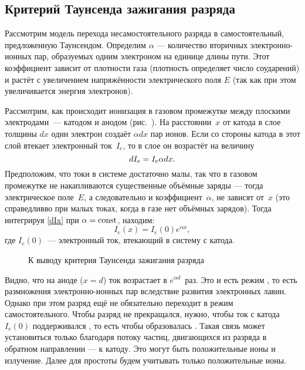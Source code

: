 \subsection*{Критерий Таунсенда зажигания разряда}
Рассмотрим модель перехода несамостоятельного разряда в самостоятельный,
предложенную Таунсендом.
Определим  $\alpha$ ---
количество вторичных электронно-ионных пар, образуемых одним электроном
на единице длины пути.
Этот коэффициент зависит от плотности газа
(плотность определяет число соударений)
и растёт с увеличением напряжённости электрического поля $E$
(так как при этом увеличивается энергия электронов).

Рассмотрим, как происходит ионизация в газовом промежутке между плоскими
электродами~--- катодом и анодом (рис.~). На
расстоянии~$x$ от катода в слое толщины $dx$ один электрон создаёт $\alpha dx$
пар ионов. Если со стороны катода в этот
слой втекает электронный ток~$I_e$, то в слое он возрастёт на величину
\begin{equation}
\eqmark{dIx}
dI_e=I_e\alpha dx.
\end{equation}
Предположим, что токи в системе достаточно малы, так что в газовом промежутке
не накапливаются существенные объёмные заряды --- тогда электрическое поле~$E$,
а следовательно и коэффициент~$\alpha$, не зависят от~$x$
(это справедливво при малых токах, когда в газе нет объёмных зарядов).
Тогда интегрируя \eqref{dIx} при $\alpha=\mathrm{const}$, находим:
\begin{equation*}
	I_e(x)=I_e(0)e^{\alpha x},
\end{equation*}
где $I_e(0)$~--- электронный ток, втекающий в систему с катода.

\begin{wrapfigure}{o}{0.3\textwidth}
    \centering
    \caption{К выводу критерия Таунсенда зажигания разряда}
\end{wrapfigure}

Видно, что на аноде ($x=d$) ток возрастает в $e^{\alpha d}$~раз.
Это и есть режим , то есть размножения
электронно-ионных пар вследствие развития
электронных лавин. Однако при этом разряд ещё не обязательно переходит в режим
самостоятельного. Чтобы разряд не прекращался, нужно,
чтобы ток с катода $I_e(0)$ поддерживался ,
то есть чтобы образовалась .
Такая связь может установиться только благодаря потоку частиц, двигающихся
из разряда в обратном направлении --- к катоду. Это могут быть 
положительные ионы и излучение. 
Далее для простоты будем учитывать только положительные ионы.

